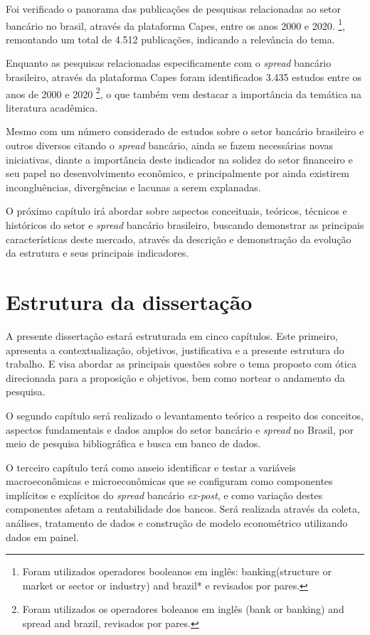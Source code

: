 \documentclass[12pt,openright,oneside,a4paper,chapter=TITLE,section=TITLE,subsection=TITLE,english,french,spanish,portugues,sumario=tradicional]{04-class-files/abntex2}
\begin{document}
Foi verificado o panorama das publicações de pesquisas relacionadas ao setor
bancário no brasil, através da plataforma Capes, entre os anos 2000 e 2020.
\footnote{Foram utilizados operadores booleanos em inglês: banking(structure or
market or sector or industry) and brazil* e revisados por pares.}, remontando um total de 4.512 publicações, indicando a relevância do tema.

Enquanto as pesquisas relacionadas especificamente com o \emph{spread} bancário
brasileiro, através da plataforma Capes foram identificados 3.435 estudos entre
os anos de 2000 e 2020 \footnote{Foram utilizados os operadores boleanos em
inglês (bank or banking) and spread and brazil, revisados por pares.}, o que
também vem destacar a importância da temática na literatura acadêmica.

Mesmo com um número considerado de estudos sobre o setor bancário brasileiro e
outros diversos citando o \emph{spread} bancário, ainda se fazem necessárias novas
iniciativas, diante a importância deste indicador na solidez do setor financeiro e seu papel no desenvolvimento econômico, e principalmente por ainda existirem incongluências, divergências e lacunas a serem explanadas.

O próximo capítulo irá abordar sobre aspectos conceituais, teóricos, técnicos e históricos do setor e \emph{spread} bancário brasileiro, buscando demonstrar as principais características deste mercado, através da descrição e demonstração da evolução da estrutura e seus principais indicadores.

\section{Estrutura da dissertação}

A presente dissertação estará estruturada em cinco capítulos. Este primeiro, apresenta a contextualização, objetivos, justificativa e a presente estrutura do trabalho. E visa abordar as principais questões sobre o tema proposto com ótica direcionada para a proposição e objetivos, bem como nortear o andamento da pesquisa.

O segundo capítulo será realizado o levantamento teórico a respeito dos
conceitos, aspectos fundamentais e dados amplos do setor bancário e \emph{spread} no Brasil, por meio de pesquisa bibliográfica e busca em banco de dados.

O terceiro capítulo terá como anseio identificar e testar a variáveis macroeconômicas e microeconômicas que se configuram como componentes implícitos e explícitos do \emph{spread} bancário \emph{ex-post}, e como variação destes componentes afetam a rentabilidade dos bancos. Será realizada através da coleta, análises, tratamento de dados e construção de modelo econométrico utilizando dados em painel.
\end{document}
